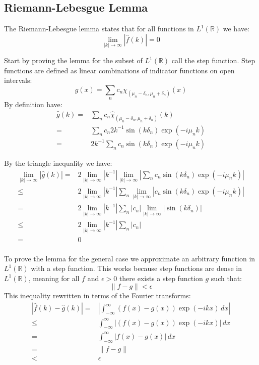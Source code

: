 \documentclass[12pt]{report}
\begin{document}
\subsection{Riemann-Lebesgue Lemma}
The Riemann-Lebesgue lemma states that for all functions in $L^1(\mathbb{R})$ we have:
\[\lim_{|k|\rightarrow \infty}|\hat{f}(k)|= 0  \]

Start by proving the lemma for the subset of $L^1(\mathbb{R})$ call the step function. 
Step functions are defined as linear combinations of indicator functions on open intervals:
\[g(x) = \sum_{n}c_n\chi_{(\mu_n-\delta_n,\mu_n+\delta_n)}(x)\]
By definition have:
\begin{equation*}
\begin{aligned}
\hat{g}(k) =& \sum_nc_n\hat{\chi}_{(\mu_n-\delta_n,\mu_n+\delta_n)}(k)\\
=& \sum_nc_n2k^{-1}\sin\left(k\delta_n\right)\exp(-i\mu_n k) \\
=& 2k^{-1}\sum_nc_n\sin\left(k\delta_n\right)\exp(-i\mu_n k)
\end{aligned}
\end{equation*}

By the triangle inequality we have:
\begin{equation*}
\begin{aligned}
\lim_{|k|\rightarrow \infty}|\hat{g}(k)| =& 2\lim_{|k|\rightarrow \infty}|k^{-1}|\lim_{|k|\rightarrow \infty}\left|\sum_nc_n\sin\left(k\delta_n\right)\exp(-i\mu_n k)\right| \\
\leq& 2\lim_{|k|\rightarrow \infty}|k^{-1}|\sum_n\lim_{|k|\rightarrow \infty}\left|c_n\sin\left(k\delta_n\right)\exp(-i\mu_n k)\right| \\
=& 2\lim_{|k|\rightarrow \infty}|k^{-1}|\sum_n|c_n|\lim_{|k|\rightarrow \infty}\left|\sin\left(k\delta_n\right)\right| \\
\leq&2\lim_{|k|\rightarrow \infty}|k^{-1}|\sum_n|c_n| \\
=& 0\\
\end{aligned}
\end{equation*}

To prove the lemma for the general case we approximate an arbitrary function in $L^1(\mathbb{R})$ with a step function.
This works because step functions are dense in $L^1(\mathbb{R})$, meaning for all $f$ and $\epsilon > 0$ there exists a step function $g$ such that:
\[\|f-g\| < \epsilon\]
This inequality rewritten in terms of the Fourier transforms:
\begin{equation*}
\begin{aligned}
|\hat{f}(k)-\hat{g}(k)| =&\left|\int_{-\infty}^{\infty}(f(x)-g(x))\exp(-ikx)\,dx\right| \\
\leq& \int_{-\infty}^{\infty}|(f(x)-g(x))\exp(-ikx)|\,dx  \\
=&\int_{-\infty}^{\infty}|f(x)-g(x)|\,dx  \\
=&\|f-g\|\\
<& \epsilon \\
\end{aligned}
\end{equation*}
\end{document}
